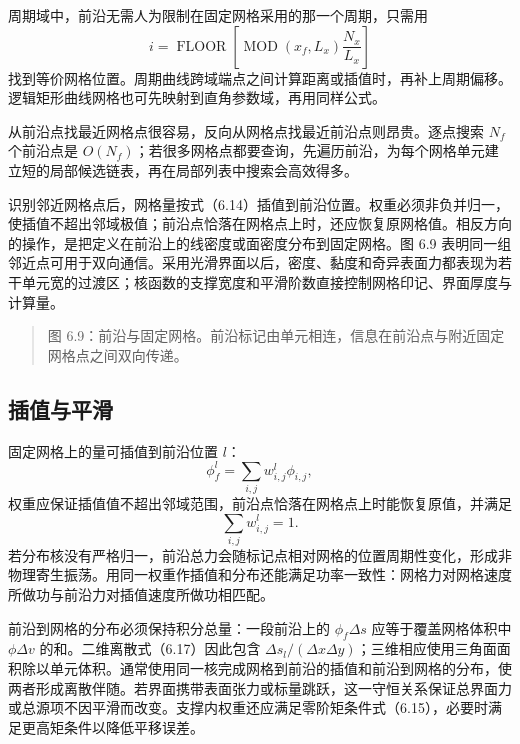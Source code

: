 \documentclass[11pt,a4paper,openany,fontset=none]{ctexbook}
\begin{document}
周期域中，前沿无需人为限制在固定网格采用的那一个周期，只需用
\begin{equation}
i=\operatorname{FLOOR}\!\left[
\operatorname{MOD}(x_f,L_x)\frac{N_x}{L_x}\right]
\tag{6.13}
\end{equation}
找到等价网格位置。周期曲线跨域端点之间计算距离或插值时，再补上周期偏移。逻辑矩形曲线网格也可先映射到直角参数域，再用同样公式。

从前沿点找最近网格点很容易，反向从网格点找最近前沿点则昂贵。逐点搜索 $N_f$ 个前沿点是 $O(N_f)$；若很多网格点都要查询，先遍历前沿，为每个网格单元建立短的局部候选链表，再在局部列表中搜索会高效得多。

识别邻近网格点后，网格量按式（6.14）插值到前沿位置。权重必须非负并归一，使插值不超出邻域极值；前沿点恰落在网格点上时，还应恢复原网格值。相反方向的操作，是把定义在前沿上的线密度或面密度分布到固定网格。图 6.9 表明同一组邻近点可用于双向通信。采用光滑界面以后，密度、黏度和奇异表面力都表现为若干单元宽的过渡区；核函数的支撑宽度和平滑阶数直接控制网格印记、界面厚度与计算量。

\begin{quote}\small 图 6.9：前沿与固定网格。前沿标记由单元相连，信息在前沿点与附近固定网格点之间双向传递。\end{quote}
\subsection{插值与平滑}

固定网格上的量可插值到前沿位置 $l$：
\begin{equation}
\phi_f^l=\sum_{i,j}w_{i,j}^l\phi_{i,j},
\tag{6.14}
\end{equation}
权重应保证插值值不超出邻域范围，前沿点恰落在网格点上时能恢复原值，并满足
\begin{equation}
\sum_{i,j}w_{i,j}^l=1.
\tag{6.15}
\end{equation}
若分布核没有严格归一，前沿总力会随标记点相对网格的位置周期性变化，形成非物理寄生振荡。用同一权重作插值和分布还能满足功率一致性：网格力对网格速度所做功与前沿力对插值速度所做功相匹配。

前沿到网格的分布必须保持积分总量：一段前沿上的 $\phi_f\Delta s$ 应等于覆盖网格体积中 $\phi\Delta v$ 的和。二维离散式（6.17）因此包含 $\Delta s_l/(\Delta x\Delta y)$；三维相应使用三角面面积除以单元体积。通常使用同一核完成网格到前沿的插值和前沿到网格的分布，使两者形成离散伴随。若界面携带表面张力或标量跳跃，这一守恒关系保证总界面力或总源项不因平滑而改变。支撑内权重还应满足零阶矩条件式（6.15），必要时满足更高矩条件以降低平移误差。
\end{document}
